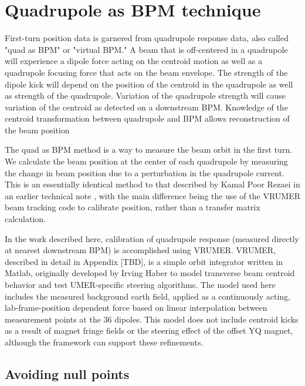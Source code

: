  

\section{Quadrupole as BPM technique} \label{sec:steering:quas-as-bpm}

First-turn position data is garnered from quadrupole response data, also called "quad as BPM" or "virtual BPM." A beam that is off-centered in a quadrupole will experience a dipole force acting on the centroid motion as well as a quadrupole focusing force that acts on the beam envelope. The strength of the dipole kick will depend on the position of the centroid in the quadrupole as well as strength of the quadrupole. Variation of the quadrupole strength will cause variation of the centroid as detected on a downstream BPM. Knowledge of the centroid transformation between quadrupole and BPM allows reconstruction of the beam position 


The quad as BPM method is a way to measure the beam orbit in the first turn. We calculate the beam position at the center of 
each quadrupole by measuring the change in beam position due to a perturbation in the quadrupole current. 
This is an essentially identical method to that described by Kamal Poor Rezaei in an earlier technical note \cite{KPRnote:2012}, 
with the main difference being the use of the VRUMER beam tracking code to calibrate position, rather than a transfer matrix calculation.  



In the work described here, calibration of quadrupole response (measured directly at nearest downstream BPM) is accomplished using VRUMER. VRUMER, described in detail in Appendix [TBD],
is a simple orbit integrator written in Matlab, originally developed by Irving Haber to model transverse beam centroid behavior and test UMER-specific steering algorithms.
The model used here includes the measured background earth field, applied as a continuously acting, lab-frame-position dependent force based on linear interpolation between measurement points at the 36 dipoles.
This model does not include centroid kicks as a result of magnet fringe fields or the steering effect of the offset YQ magnet, although the framework can support these refinements.



\subsection{Avoiding null points} \label{sec:steering:nulls}


